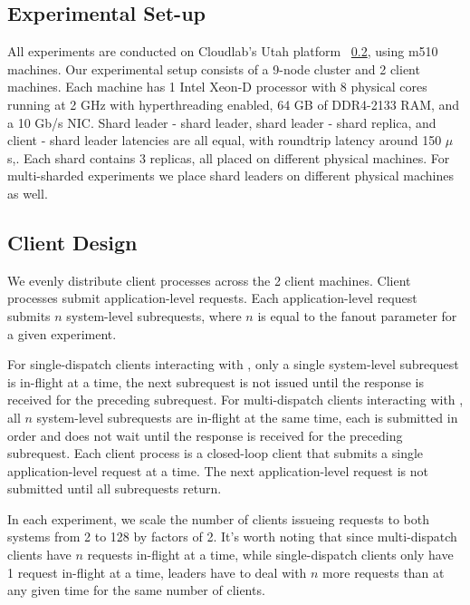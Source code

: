 \subsection{Experimental Set-up}
All experiments are conducted on Cloudlab's Utah platform ~\ref{}, using m510 machines. 
Our experimental setup consists of a 9-node cluster and 2 client machines. 
Each machine has 1 Intel Xeon-D processor with 8 physical cores running at 2 GHz with hyperthreading enabled, 64 GB of DDR4-2133 RAM, and a 10 Gb/s NIC. 
Shard leader - shard leader, shard leader - shard replica, and client - shard leader latencies are all equal, with roundtrip latency around 150 $\mu$s,. 
Each shard contains 3 replicas, all placed on different physical machines. For multi-sharded experiments we place shard leaders on different physical machines as well. 



\subsection{Client Design}
We evenly distribute client processes across the 2 client machines. Client processes submit application-level requests. Each application-level request submits $n$ system-level subrequests, where $n$ is equal to the fanout parameter for a given experiment. 

For single-dispatch clients interacting with \mpaxos, only a single system-level subrequest is in-flight at a time, the next subrequest is not issued until the response is received for the preceding subrequest. For multi-dispatch clients interacting with \system, all $n$ system-level subrequests are in-flight at the same time, each is submitted in order and does not wait until the response is received for the preceding subrequest. Each client process is a closed-loop client that submits a single application-level request at a time. The next application-level request is not submitted until all subrequests return. 

In each experiment, we scale the number of clients issueing requests to both systems from 2 to 128 by factors of 2. It's worth noting that since multi-dispatch clients have $n$ requests in-flight at a time, while single-dispatch clients only have 1 request in-flight at a time, \system leaders have to deal with $n$ more requests than \mpaxos at any given time for the same number of clients.

